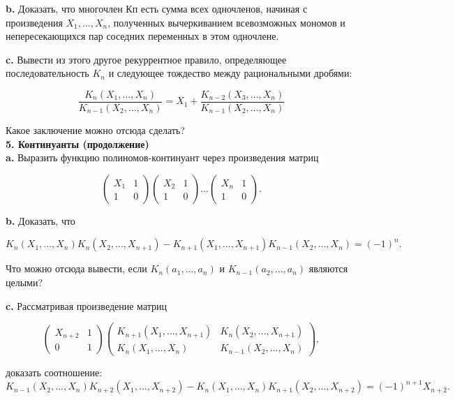 \textbf{b.} Доказать, что многочлен Кп есть сумма всех одночленов, 
начиная с произведения $X_1,...,X_n$, полученных вычеркиванием 
всевозможных мономов и непересекающихся пар соседних переменных в этом 
одночлене.

\textbf{c.} Вывести из этого другое рекуррентное правило, определяющее
последовательность $K_n$ и следующее тождество между рациональными
дробями:

\[
\frac{K_n(X_1,...,X_n)}{K_{n-1}(X_2,...,X_n)} = X_1+\frac{K_{n-2}(X_3,...,X_n)}{K_{n-1}(X_2,...,X_n)}
\]

\noindent Какое заключение можно отсюда сделать?
\\

\noindent \textbf{5. Континуанты (продолжение)}
\\

\textbf{a.} Выразить функцию полиномов-континуант через произведения
матриц

\[
\begin{pmatrix}
X_1 & 1\\
1 & 0
\end{pmatrix} \begin{pmatrix}
X_2 & 1\\
1 & 0
\end{pmatrix} ... \begin{pmatrix}
X_n & 1\\
1 & 0
\end{pmatrix}.
\]

\pagebreak

\textbf{b.} Доказать, что

\[
K_n(X_1,...,X_n)K_n(X_2,...,X_{n+1})-K_{n+1}(X_1,...,X_{n+1})K_{n-1}(X_2,...,X_n) = (-1)^n.
\]

\noindent Что можно отсюда вывести, если $K_n(a_1,...,a_n)$ и $K_{n-1}(a_2,...,a_n)$ являются целыми?

\textbf{c.} Рассматривая произведение матриц

\[
\begin{pmatrix}
X_{n+2} & 1\\
0 & 1
\end{pmatrix} \begin{pmatrix}
K_{n+1}(X_1,...,X_{n+1}) & K_n(X_2,...,X_{n+1})\\
K_n(X_1,...,X_n) & K_{n-1}(X_2,...,X_n)
\end{pmatrix},
\]

\noindent доказать соотношение:
\[
K_{n-1}(X_2,...,X_n)K_{n+2}(X_1,...,X_{n+2})-K_n(X_1,...,X_n)K_{n+1}(X_2,...,X_{n+2}) = (-1)^{n+1}X_{n+2}.
\]

